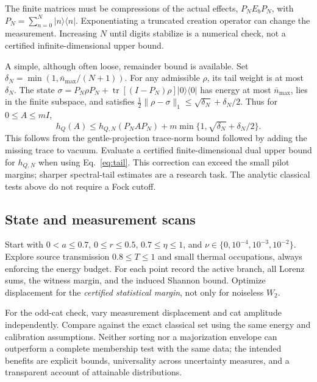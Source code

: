 \documentclass[11pt,a4paper]{article}
\newcommand{\tr}{\operatorname{tr}}
\newcommand{\nbar}{\bar n_{\max}}
\newcommand{\ket}[1]{\lvert #1\rangle}
\newcommand{\bra}[1]{\langle #1\rvert}
\newcommand{\norm}[1]{\lVert #1\rVert}
\newcommand{\I}{I}
\begin{document}
The finite matrices must be compressions of the actual effects,
$P_NE_bP_N$, with $P_N=\sum_{n=0}^N\ket n\bra n$.
Exponentiating a truncated creation operator can change the measurement.
Increasing $N$ until digits stabilize is a numerical check, not a certified
infinite-dimensional upper bound.

A simple, although often loose, remainder bound is available. Set
$\delta_N=\min(1,\nbar/(N+1))$.
For any admissible $\rho$, its tail weight is at most $\delta_N$.
The state $\sigma=P_N\rho P_N+\tr[(\I-P_N)\rho]\ket0\bra0$
has energy at most $\nbar$, lies in the finite subspace, and satisfies
$\tfrac12\norm{\rho-\sigma}_1\leq\sqrt{\delta_N}+\delta_N/2$.
Thus for $0\leq A\leq m\I$,
\begin{equation}
 h_Q(A)\leq h_{Q,N}(P_NAP_N)
 +m\min\{1,\sqrt{\delta_N}+\delta_N/2\}.
 \label{eq:tail}
\end{equation}
This follows from the gentle-projection trace-norm bound followed by adding
the missing trace to vacuum. Evaluate a certified finite-dimensional dual
upper bound for $h_{Q,N}$ when using Eq.~\eqref{eq:tail}. This correction
can exceed the small pilot margins; sharper spectral-tail estimates are a
research task. The analytic classical tests above do not require a Fock cutoff.

\subsection{State and measurement scans}
Start with $0<a\leq0.7$, $0\leq r\leq0.5$, $0.7\leq\eta\leq1$, and
$\nu\in\{0,10^{-4},10^{-3},10^{-2}\}$. Explore source transmission
$0.8\leq T\leq1$ and small thermal occupations, always enforcing the energy
budget. For each point record the active branch, all Lorenz sums, the witness
margin, and the induced Shannon bound. Optimize displacement for the
\emph{certified statistical margin}, not only for noiseless $W_2$.

For the odd-cat check, vary measurement displacement and cat amplitude
independently. Compare against the exact classical set using the same
energy and calibration assumptions. Neither sorting nor a majorization
envelope can outperform a complete membership test with the same data;
the intended benefits are explicit bounds, universality across uncertainty
measures, and a transparent account of attainable distributions.
\end{document}
